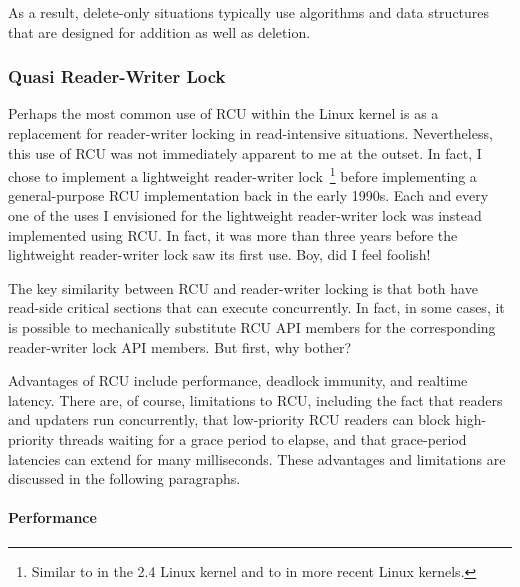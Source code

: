 As a result, delete-only situations typically use algorithms and data
structures that are designed for addition as well as deletion.

\subsubsection{Quasi Reader-Writer Lock}
\label{sec:defer:Quasi Reader-Writer Lock}

Perhaps the most common use of RCU within the Linux kernel is as
a replacement for reader-writer locking in read-intensive situations.
Nevertheless, this use of RCU was not immediately apparent to me
at the outset.
In fact, I chose to implement a lightweight reader-writer
lock~\cite{WilsonCHsieh92a}\footnote{
	Similar to  in the 2.4 Linux kernel and to
	 in more recent Linux kernels.}
before implementing a general-purpose RCU implementation
back in the early 1990s.
Each and every one of the uses I envisioned for the lightweight reader-writer
lock was instead implemented using RCU\@.
In fact, it was more than
three years before the lightweight reader-writer lock saw its first use.
Boy, did I feel foolish!

The key similarity between RCU and reader-writer locking is that
both have read-side critical sections that can execute concurrently.
In fact, in some cases, it is possible to mechanically substitute RCU API
members for the corresponding reader-writer lock API members.
But first, why bother?

Advantages of RCU include performance,
deadlock immunity, and realtime latency.
There are, of course, limitations to RCU, including the fact that
readers and updaters run concurrently, that low-priority RCU readers
can block high-priority threads waiting for a grace period to elapse,
and that grace-period latencies can extend for many milliseconds.
These advantages and limitations are discussed in the following paragraphs.

\paragraph{Performance}

